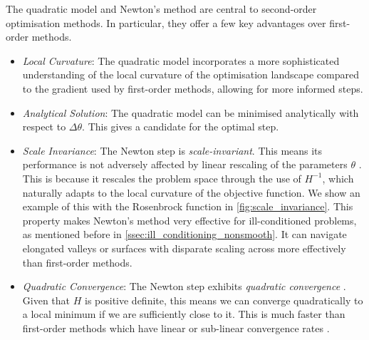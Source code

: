The quadratic model and Newton's method are central to second-order optimisation methods. In particular, they offer a few key advantages over first-order methods. 
\begin{itemize}
    \item \textit{Local Curvature}: The quadratic model incorporates a more sophisticated understanding of the local curvature of the optimisation landscape compared to the gradient used by first-order methods, allowing for more informed steps.
    \item \textit{Analytical Solution}: The quadratic model can be minimised analytically with respect to $\Delta \theta$. This gives a candidate for the optimal step. 
    \item \textit{Scale Invariance}: The Newton step is \textit{scale-invariant}. This means its performance is not adversely affected by linear rescaling of the parameters $\theta$ \citep{NoceWrig06}. This is because it rescales the problem space through the use of $H^{-1}$, which naturally adapts to the local curvature of the objective function. We show an example of this with the Rosenbrock function in \cref{fig:scale_invariance}.
    This property makes Newton's method very effective for ill-conditioned problems, as mentioned before in \cref{ssec:ill_conditioning_nonsmooth}. It can navigate elongated valleys or surfaces with disparate scaling across more effectively than first-order methods.
    \item \textit{Quadratic Convergence}: The Newton step exhibits \textit{quadratic convergence} \citep{NoceWrig06, cvbook}. Given that $H$ is positive definite, this means we can converge quadratically to a local minimum if we are sufficiently close to it. This is much faster than first-order methods which have linear or sub-linear convergence rates \citep{NoceWrig06, cvbook, mml_book}.
\end{itemize}

